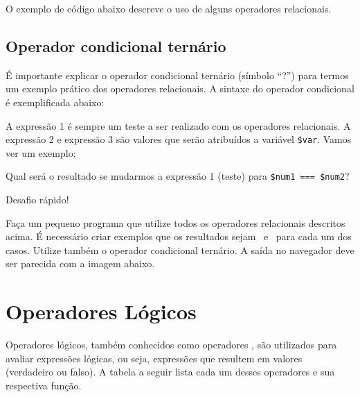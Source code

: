 

O exemplo de código abaixo descreve o uso de alguns operadores relacionais.



\subsection{Operador condicional ternário}
\label{operador-condicional-ternario}

É importante explicar o operador condicional ternário (símbolo ``?'') para termos um exemplo 
prático dos operadores relacionais. A sintaxe do operador condicional é exemplificada abaixo:



A expressão 1 é sempre um teste a ser realizado com os operadores relacionais. A expressão
2 e expressão 3 são valores que serão atribuídos a variável \texttt{\$var}. Vamos ver um exemplo:



Qual será o resultado se mudarmos a expressão 1 (teste) para \texttt{\$num1 === \$num2}?

\begin{framed}
{\Large Desafio rápido!}

Faça um pequeno programa que utilize todos os operadores relacionais descritos acima.
É necessário criar exemplos que os resultados sejam \true~e \false~para cada
um dos casos. Utilize também o operador condicional ternário. A saída no navegador
deve ser parecida com a imagem abaixo.

\end{framed}

\section{Operadores Lógicos}
\label{operadores-logicos}

Operadores lógicos, também conhecidos como operadores \booleanos, são utilizados para
avaliar expressões lógicas, ou seja, expressões que resultem em valores \booleanos~
(verdadeiro ou falso). A tabela a seguir lista cada um desses operadores e sua respectiva
função.

